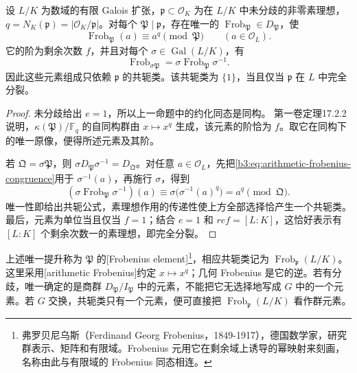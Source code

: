 \begin{theorem}\label{b3:thm:arithmetic-frobenius}
	设 \(L/K\) 为数域的有限 Galois 扩张，\(\mathfrak p\subset\mathcal O_K\) 为在 \(L/K\) 中未分歧的非零素理想，\(q=N_K(\mathfrak p)=|\mathcal O_K/\mathfrak p|\)。对每个 \(\mathfrak P\mid\mathfrak p\)，存在唯一的 \(\operatorname{Frob}_{\mathfrak P}\in D_{\mathfrak P}\)，使
	\begin{equation}\label{b3:eq:arithmetic-frobenius-congruence}
		\operatorname{Frob}_{\mathfrak P}(a)\equiv a^q\pmod{\mathfrak P}
		\qquad(a\in\mathcal O_L).
	\end{equation}
	它的阶为剩余次数 \(f\)，并且对每个 \(\sigma\in\operatorname{Gal}(L/K)\)，有
	\[
		\operatorname{Frob}_{\sigma\mathfrak P}
		=\sigma\operatorname{Frob}_{\mathfrak P}\sigma^{-1}.
	\]
	因此这些元素组成只依赖 \(\mathfrak p\) 的共轭类。该共轭类为 \(\{1\}\)，当且仅当 \(\mathfrak p\) 在 \(L\) 中完全分裂。
\end{theorem}
\begin{proof}
	未分歧给出 \(e=1\)，所以上一命题中的约化同态是同构。
	第一卷定理17.2.2说明，\(\kappa(\mathfrak P)/\mathbb F_q\) 的自同构群由 \(x\mapsto x^q\) 生成，该元素的阶恰为 \(f\)。取它在同构下的唯一原像，便得所述元素及其阶。

	若 \(\mathfrak Q=\sigma\mathfrak P\)，则 \(\sigma D_{\mathfrak P}\sigma^{-1}=D_{\mathfrak Q}\)。对任意 \(a\in\mathcal O_L\)，先把\eqref{b3:eq:arithmetic-frobenius-congruence}用于 \(\sigma^{-1}(a)\)，再施行 \(\sigma\)，得到
	\[
		(\sigma\operatorname{Frob}_{\mathfrak P}\sigma^{-1})(a)
		\equiv\sigma\bigl(\sigma^{-1}(a)^q\bigr)=a^q\pmod{\mathfrak Q}.
	\]
	唯一性即给出共轭公式，素理想作用的传递性使上方全部选择恰产生一个共轭类。最后，元素为单位当且仅当 \(f=1\)；结合 \(e=1\) 和 \(ref=[L:K]\)，这恰好表示有 \([L:K]\) 个剩余次数一的素理想，即完全分裂。
\end{proof}

上述唯一提升称为 \(\mathfrak P\) 的[Frobenius element]\footnote{弗罗贝尼乌斯（Ferdinand Georg Frobenius，1849-1917），德国数学家，研究群表示、矩阵和有限域。Frobenius 元用它在剩余域上诱导的幂映射来刻画，名称由此与有限域的 Frobenius 同态相连。}，相应共轭类记为 \(\operatorname{Frob}_{\mathfrak p}(L/K)\)。这里采用[arithmetic Frobenius]约定 \(x\mapsto x^q\)；几何 Frobenius 是它的逆。若有分歧，唯一确定的是商群 \(D_{\mathfrak P}/I_{\mathfrak P}\) 中的元素，不能把它无选择地写成 \(G\) 中的一个元素。若 \(G\) 交换，共轭类只有一个元素，便可直接把 \(\operatorname{Frob}_{\mathfrak p}(L/K)\) 看作群元素。

